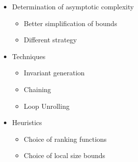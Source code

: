 \begin{itemize}[<+->]
\item Determination of asymptotic complexity
  \begin{itemize}
    \item Better simplification of bounds
    \item Different strategy 
  \end{itemize}
\item Techniques
  \begin{itemize}
  \item Invariant generation
  \item Chaining
  \item Loop Unrolling
  \end{itemize}
\item Heuristics
  \begin{itemize}
  \item Choice of ranking functions
  \item Choice of local size bounds
  \end{itemize}
\end{itemize}
